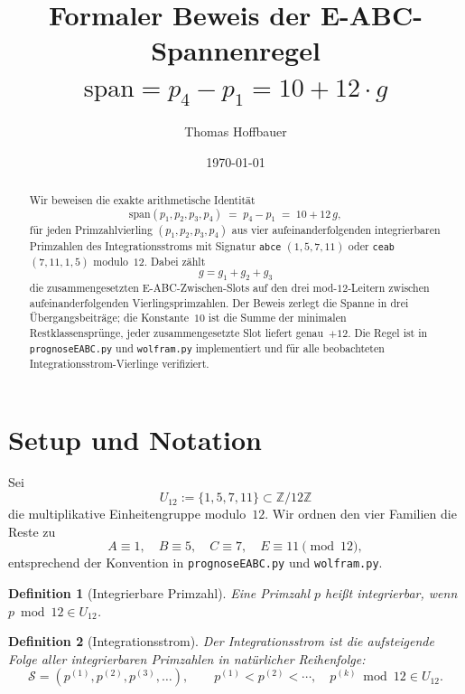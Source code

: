 \documentclass[11pt,a4paper]{article}
\title{Formaler Beweis der E-ABC-Spannenregel\\[0.4em]
\large $\mathrm{span} = p_4 - p_1 = 10 + 12\cdot g$}
\author{Thomas Hoffbauer}
\date{\today}
\newtheorem{definition}{Definition}
\newcommand{\Z}{\mathbb{Z}}
\begin{document}
\maketitle

\begin{abstract}
Wir beweisen die exakte arithmetische Identität
\[
  \mathrm{span}(p_1,p_2,p_3,p_4)
  \;=\;
  p_4 - p_1
  \;=\;
  10 + 12\,g,
\]
für jeden Primzahlvierling $(p_1,p_2,p_3,p_4)$ aus vier aufeinanderfolgenden
integrierbaren Primzahlen des Integrationsstroms mit Signatur \texttt{abce}
$(1,5,7,11)$ oder \texttt{ceab} $(7,11,1,5)$ modulo~$12$.
Dabei zählt
\[
  g = g_1 + g_2 + g_3
\]
die zusammengesetzten E-ABC-Zwischen-Slots auf den drei mod-$12$-Leitern
zwischen aufeinanderfolgenden Vierlingsprimzahlen.
Der Beweis zerlegt die Spanne in drei Übergangsbeiträge; die Konstante~$10$
ist die Summe der minimalen Restklassensprünge, jeder zusammengesetzte Slot
liefert genau~$+12$.
Die Regel ist in \texttt{prognoseEABC.py} und \texttt{wolfram.py} implementiert
und für alle beobachteten Integrationsstrom-Vierlinge verifiziert.
\end{abstract}

\section{Setup und Notation}

Sei
\[
  U_{12} := \{1,5,7,11\} \subset \Z/12\Z
\]
die multiplikative Einheitengruppe modulo~$12$.
Wir ordnen den vier Familien die Reste zu
\[
  A \equiv 1,\quad
  B \equiv 5,\quad
  C \equiv 7,\quad
  E \equiv 11 \pmod{12},
\]
entsprechend der Konvention in \texttt{prognoseEABC.py} und \texttt{wolfram.py}.

\begin{definition}[Integrierbare Primzahl]
Eine Primzahl $p$ heißt \emph{integrierbar}, wenn $p \bmod 12 \in U_{12}$.
\end{definition}

\begin{definition}[Integrationsstrom]
Der \emph{Integrationsstrom} ist die aufsteigende Folge aller integrierbaren
Primzahlen in natürlicher Reihenfolge:
\[
  \mathcal{S} = (p^{(1)}, p^{(2)}, p^{(3)}, \ldots),
  \qquad
  p^{(1)} < p^{(2)} < \cdots,\quad
  p^{(k)} \bmod 12 \in U_{12}.
\]
\end{definition}
\end{document}
